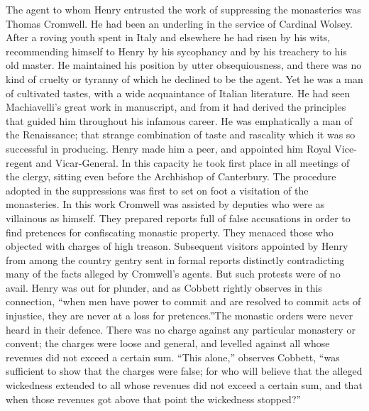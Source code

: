 \documentclass{book}
\begin{document}
The agent to whom Henry entrusted the work of suppressing the monasteries was Thomas Cromwell. He had been an underling in the service of Cardinal Wolsey. After a roving youth spent in Italy and elsewhere he had risen by his wits, recommending himself to Henry by his sycophancy and by his treachery to his old master. He maintained his position by utter obsequiousness, and there was no kind of cruelty or tyranny of which he declined to be the agent. Yet he was a man of cultivated tastes, with a wide acquaintance of Italian literature. He had seen Machiavelli’s great work in manuscript, and from it had derived the principles that guided him throughout his infamous career. He was emphatically a man of the Renaissance; that strange combination of taste and rascality which it was so successful in producing. Henry made him a peer, and appointed him Royal Vice-regent and Vicar-General. In this capacity he took first place in all meetings of the clergy, sitting even before the Archbishop of Canterbury. The procedure adopted in the suppressions was first to set on foot a visitation of the monasteries. In this work Cromwell was assisted by deputies who were as villainous as himself. They prepared reports full of false accusations in order to find pretences for confiscating monastic property. They menaced those who objected with charges of high treason. Subsequent visitors appointed by Henry from among the country gentry sent in formal reports distinctly contradicting many of the facts alleged by Cromwell’s agents. But such protests were of no avail. Henry was out for plunder, and as Cobbett rightly observes in this connection, “when men have power to commit and are resolved to commit acts of injustice, they are never at a loss for pretences.”\footnotemark[1] The monastic orders were never heard in their defence. There was no charge against any particular monastery or convent; the charges were loose and general, and levelled against all whose revenues did not exceed a certain sum. “This alone,” observes Cobbett, “was sufficient to show that the charges were false; for who will believe that the alleged wickedness extended to all whose revenues did not exceed a certain sum, and that when those revenues got above that point the wickedness stopped?”\footnotemark[2]
\end{document}
